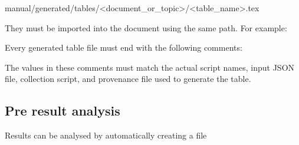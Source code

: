 \begin{DocCode}
manual/generated/tables/<document_or_topic>/<table_name>.tex
\end{DocCode}

They must be imported into the document using the same path. For example:

\begin{DocCode}
\begin{table}[ht]
\centering
\caption{Caption text}
\label{tab:acc_main_experiment_table}

\end{table}
\end{DocCode}

Every generated table file must end with the following comments:

\begin{DocCode}
\end{DocCode}

The values in these comments must match the actual script names, input JSON file, collection script, and provenance file used to generate the table.

\subsection*{Pre result analysis}
Results can be analysed by automatically creating a  file


